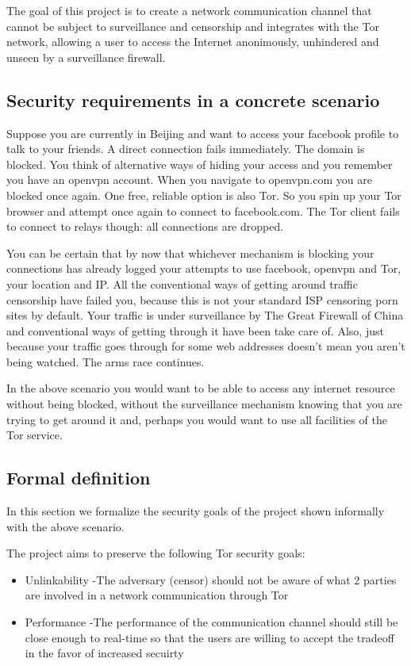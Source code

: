 \documentclass[11pt]{article} %
\begin{document}
The goal of this project is to create a network communication channel that cannot be subject to surveillance and censorship and integrates with the Tor network, allowing a user to access the Internet anonimously, unhindered and unseen by a surveillance firewall.

\subsection{Security requirements in a concrete scenario}

Suppose you are currently in Beijing and want to access your facebook profile to talk to your friends. A direct connection fails immediately. The domain is blocked. You think of alternative ways of hiding your access and you remember you have an openvpn account. When you navigate to openvpn.com you are blocked once again. One free, reliable option is also Tor. So you spin up your Tor browser and attempt once again to connect to facebook.com. The Tor client fails to connect to relays though: all connections are dropped.  \citep*{web:blockedInChina}

You can be certain that by now that whichever mechanism is blocking your connections has already logged your attempts to use facebook, openvpn and Tor, your location and IP.  All the conventional ways of getting around traffic censorship have failed you, because this is not your standard ISP censoring porn sites by default. Your traffic is under surveillance by The Great Firewall of China and conventional ways of getting through it have been take care of. Also, just because your traffic goes through for some web addresses doesn't mean you aren't being watched. The arms race continues.

In the above scenario you would want to be able to access any internet resource without being blocked, without the surveillance mechanism knowing that you are trying to get around it and, perhaps you would want to use all facilities of the Tor service.

\subsection{Formal definition}

In this section we formalize the security goals of the project shown informally with the above scenario.

The project aims to preserve the following Tor security goals:

\begin{itemize}
\item Unlinkability -The adversary (censor) should not be aware of what 2 parties are involved in a network communication through Tor
\item Performance -The performance of the communication channel should still be close enough to real-time so that the users are willing  to accept the tradeoff  in the favor of increased secuirty
\end{itemize}
\end{document}
